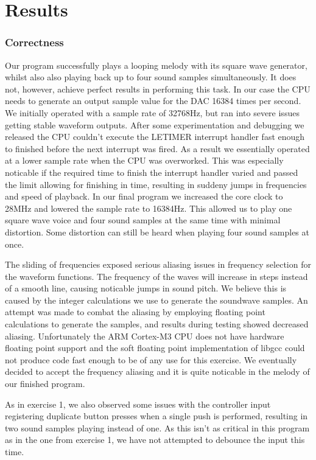 \chapter{Results}

\subsection{Correctness}

Our program successfully plays a looping melody with its square wave generator,
whilst also also playing back up to four sound samples simultaneously. It does
not, however, achieve perfect results in performing this task. In our case the
CPU needs to generate an output sample value for the DAC 16384 times per second.
We initially operated with a sample rate of 32768Hz, but ran into severe issues
getting stable waveform outputs. After some experimentation and debugging we
released the CPU couldn't execute the LETIMER interrupt handler fast enough to
finished before the next interrupt was fired. As a result we essentially
operated at a lower sample rate when the CPU was overworked. This was especially
noticable if the required time to finish the interrupt handler varied and passed
the limit allowing for finishing in time, resulting in suddeny jumps in
frequencies and speed of playback. In our final program we increased the core
clock to 28MHz and lowered the sample rate to 16384Hz. This allowed us to play
one square wave voice and four sound samples at the same time with minimal
distortion. Some distortion can still be heard when playing four sound samples
at once.

The sliding of frequencies exposed serious aliasing issues in frequency
selection for the waveform functions. The frequency of the waves will increase
in steps instead of a smooth line, causing noticable jumps in sound pitch. We
believe this is caused by the integer calculations we use to generate the
soundwave samples. An attempt was made to combat the aliasing by employing
floating point calculations to generate the samples, and results during testing
showed decreased aliasing. Unfortunately the ARM Cortex-M3 CPU does not have
hardware floating point support and the soft floating point implementation of
libgcc could not produce code fast enough to be of any use for this exercise.
We eventually decided to accept the frequency aliasing and it is quite noticable
in the melody of our finished program.

As in exercise 1, we also observed some issues with the controller input
registering duplicate button presses when a single push is performed, resulting
in two sound samples playing instead of one. As this isn't as critical in this
program as in the one from exercise 1, we have not attempted to debounce the
input this time.

